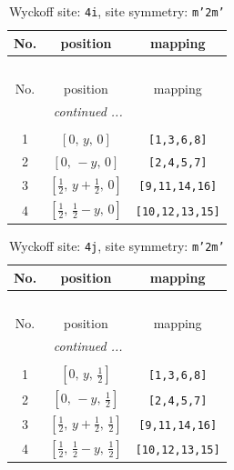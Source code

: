 \documentclass[fleqn,8pt]{jsarticle}
\begin{document}
\renewcommand{\arraystretch}{1.2}
\begin{longtable}{ccc}
\caption{Wyckoff site: {\tt 4i}, site symmetry: {\tt m'2m'}}
 \\
 \hline \hline
No. & position & mapping \\ \hline \endfirsthead

\multicolumn{2}{l}{\tablename\ \thetable{}} \\
 \hline \hline
No. & position & mapping \\ \hline \endhead

 \hline \hline
\multicolumn{2}{r}{\footnotesize\it continued ...} \\ \endfoot

 \hline \hline
\multicolumn{2}{r}{} \\ \endlastfoot

1 & $\left[ 0,\, y,\, 0 \right]$ & {\tt [1,3,6,8]} \\ \hline
2 & $\left[ 0,\, - y,\, 0 \right]$ & {\tt [2,4,5,7]} \\ \hline
3 & $\left[ \frac{1}{2},\, y + \frac{1}{2},\, 0 \right]$ & {\tt [9,11,14,16]} \\ \hline
4 & $\left[ \frac{1}{2},\, \frac{1}{2} - y,\, 0 \right]$ & {\tt [10,12,13,15]} \\
\end{longtable}
\renewcommand{\arraystretch}{1.2}
\begin{longtable}{ccc}
\caption{Wyckoff site: {\tt 4j}, site symmetry: {\tt m'2m'}}
 \\
 \hline \hline
No. & position & mapping \\ \hline \endfirsthead

\multicolumn{2}{l}{\tablename\ \thetable{}} \\
 \hline \hline
No. & position & mapping \\ \hline \endhead

 \hline \hline
\multicolumn{2}{r}{\footnotesize\it continued ...} \\ \endfoot

 \hline \hline
\multicolumn{2}{r}{} \\ \endlastfoot

1 & $\left[ 0,\, y,\, \frac{1}{2} \right]$ & {\tt [1,3,6,8]} \\ \hline
2 & $\left[ 0,\, - y,\, \frac{1}{2} \right]$ & {\tt [2,4,5,7]} \\ \hline
3 & $\left[ \frac{1}{2},\, y + \frac{1}{2},\, \frac{1}{2} \right]$ & {\tt [9,11,14,16]} \\ \hline
4 & $\left[ \frac{1}{2},\, \frac{1}{2} - y,\, \frac{1}{2} \right]$ & {\tt [10,12,13,15]} \\
\end{longtable}
\end{document}
